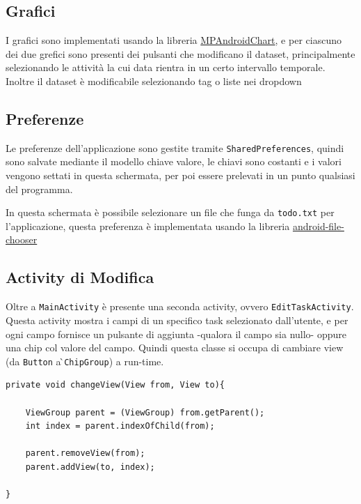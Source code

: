 \documentclass[]{article}
\begin{document}
\hypertarget{grafici-1}{%
\subsection{Grafici}\label{grafici-1}}

I grafici sono implementati usando la libreria
\href{https://github.com/PhilJay/MPAndroidChart}{MPAndroidChart}, e per
ciascuno dei due grefici sono presenti dei pulsanti che modificano il
dataset, principalmente selezionando le attività la cui data rientra in
un certo intervallo temporale. Inoltre il dataset è modificabile
selezionando tag o liste nei dropdown

\hypertarget{preferenze}{%
\subsection{Preferenze}\label{preferenze}}

Le preferenze dell'applicazione sono gestite tramite
\texttt{SharedPreferences}, quindi sono salvate mediante il modello
chiave valore, le chiavi sono costanti e i valori vengono settati in
questa schermata, per poi essere prelevati in un punto qualsiasi del
programma.

In questa schermata è possibile selezionare un file che funga da
\texttt{todo.txt} per l'applicazione, questa preferenza è implementata
usando la libreria
\href{https://github.com/hedzr/android-file-chooser}{android-file-chooser}

\hypertarget{activity-di-modifica}{%
\subsection{Activity di Modifica}\label{activity-di-modifica}}

Oltre a \texttt{MainActivity} è presente una seconda activity, ovvero
\texttt{EditTaskActivity}. Questa activity mostra i campi di un
specifico task selezionato dall'utente, e per ogni campo fornisce un
pulsante di aggiunta -qualora il campo sia nullo- oppure una chip col
valore del campo. Quindi questa classe si occupa di cambiare view (da
\texttt{Button} a ̀\texttt{ChipGroup}) a run-time.

\begin{verbatim}
private void changeView(View from, View to){

    ViewGroup parent = (ViewGroup) from.getParent();
    int index = parent.indexOfChild(from);

    parent.removeView(from);
    parent.addView(to, index);

}
\end{verbatim}
\end{document}
